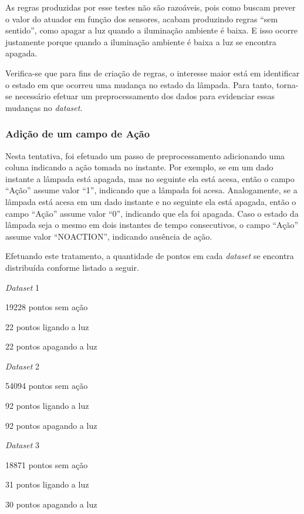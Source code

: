 As regras produzidas por esse testes não são razoáveis, pois como buscam prever o valor do atuador em função dos sensores, acabam produzindo regras ``sem sentido'', como apagar a luz quando a iluminação ambiente é baixa. E isso ocorre justamente porque quando a iluminação ambiente é baixa a luz se encontra apagada.

Verifica-se que para fins de criação de regras, o interesse maior está em identificar o estado em que ocorreu uma mudança no estado da lâmpada. Para tanto, torna-se necessário efetuar um preprocessamento dos dados para evidenciar essas mudanças no \textit{dataset}.

\clearpage

\subsubsection{Adição de um campo de Ação}
Nesta tentativa, foi efetuado um passo de preprocessamento adicionando uma coluna indicando a ação tomada no instante. Por exemplo, se em um dado instante a lâmpada está apagada, mas no seguinte ela está acesa, então o campo ``Ação'' assume valor ``1'', indicando que a lâmpada foi acesa. Analogamente, se a lâmpada está acesa em um dado instante e no seguinte ela está apagada, então o campo ``Ação'' assume valor ``0'', indicando que ela foi apagada. Caso o estado da lâmpada seja o mesmo em dois instantes de tempo consecutivos, o campo ``Ação'' assume valor ``NO\underline{\space}ACTION'', indicando ausência de ação.

Efetuando este tratamento, a quantidade de pontos em cada \textit{dataset} se encontra distribuída conforme listado a seguir.

\begin{itemize_compact}
	\item \textit{Dataset} 1
	\begin{itemize_compact}
		\item 19228 pontos sem ação
		\item 22 pontos ligando a luz
		\item 22 pontos apagando a luz
	\end{itemize_compact}
		\item \textit{Dataset} 2
	\begin{itemize_compact}
		\item 54094 pontos sem ação
		\item 92 pontos ligando a luz
		\item 92 pontos apagando a luz
	\end{itemize_compact}
		\item \textit{Dataset} 3
	\begin{itemize_compact}
		\item 18871 pontos sem ação
		\item 31 pontos ligando a luz
		\item 30 pontos apagando a luz
	\end{itemize_compact}
\end{itemize_compact}

